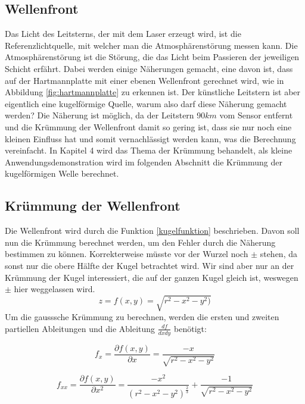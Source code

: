 \begin{refsection}
\section{Wellenfront}
Das Licht des Leitsterns, der mit dem Laser erzeugt wird, ist die Referenzlichtquelle, mit welcher man die Atmosphärenstörung messen kann. Die Atmosphärenstörung ist die Störung, die das Licht beim Passieren der jeweiligen Schicht erfährt. Dabei werden einige Näherungen gemacht, eine davon ist, dass auf der Hartmannplatte mit einer ebenen Wellenfront gerechnet wird, wie in Abbildung \ref{fig:hartmannplatte} zu erkennen ist. Der künstliche Leitstern ist aber eigentlich eine kugelförmige Quelle, warum also darf diese Näherung gemacht werden? Die Näherung ist möglich, da der Leitstern 90$km$ vom Sensor entfernt und die Krümmung der Wellenfront damit so gering ist, dass sie nur noch eine kleinen Einfluss hat und somit vernachlässigt werden kann, was die Berechnung vereinfacht. In Kapitel 4 wird das Thema der Krümmung behandelt, als kleine Anwendungsdemonstration wird im folgenden Abschnitt die Krümmung der kugelförmigen Welle berechnet.

\subsection{Krümmung der Wellenfront}
Die Wellenfront wird durch die Funktion \eqref{kugelfunktion} beschrieben. Davon soll nun die Krümmung berechnet werden, um den Fehler durch die Näherung bestimmen zu können. Korrekterweise müsste vor der Wurzel noch $\pm$ stehen, da sonst nur die obere Hälfte der Kugel betrachtet wird. Wir sind aber nur an der Krümmung der Kugel interessiert, die auf der ganzen Kugel gleich ist, weswegen  $\pm$ hier weggelassen wird.
\begin{equation}\label{kugelfunktion}
z=f(x,y)=\sqrt{r^{2}-x^{2}-y^{2})}
\end{equation}
Um die gausssche Krümmung zu berechnen, werden die ersten und zweiten partiellen Ableitungen und die Ableitung $ \frac{df}{dxdy}$ benötigt:

\begin{equation}\label{Ableitungen x}
f_{x}=\dfrac{\partial f(x,y)}{\partial x}= \dfrac{-x}{\sqrt{r^{2}-x^{2}-y^{2}}}
\end{equation}

\begin{equation}\label{Ableitungen xx}
f_{xx}=\dfrac{\partial f(x,y)}{\partial x^{2}}= \dfrac{- x^2}{(r^2 - x^2 - y^2)^{\frac{2}{3}}}+\dfrac{ - 1}{\sqrt{r^2 - x^2 - y^2}}
\end{equation}


\end{refsection}
